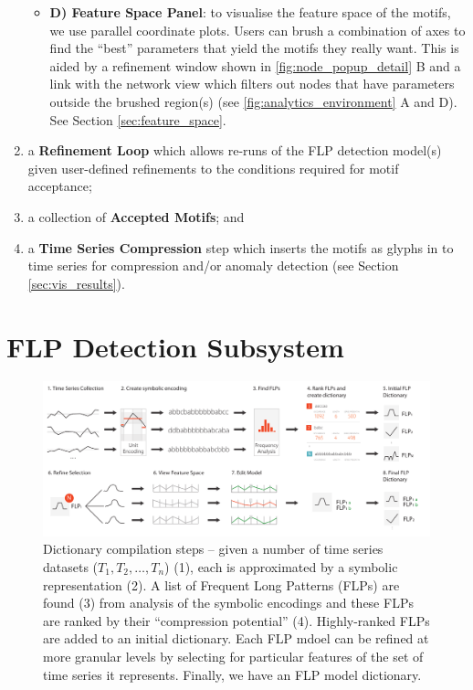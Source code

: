 \begin{enumerate}
\begin{itemize}
\item\textbf{D) Feature Space Panel}: to visualise the feature space of the motifs, we use parallel coordinate plots. 
Users can brush a combination of axes to find the ``best'' parameters that yield the motifs they really want. 
This is aided by a refinement window shown in \ref{fig:node_popup_detail} B and a link with the network view which filters out nodes that have parameters outside the brushed region(s) (see \ref{fig:analytics_environment} A and D).
See Section \ref{sec:feature_space}.

\end{itemize}

\item a \textbf{Refinement Loop} which allows re-runs of the FLP detection model(s) given user-defined refinements to the conditions required for motif acceptance;
\item a collection of \textbf{Accepted Motifs}; and 
\item a \textbf{Time Series Compression} step which inserts the motifs as glyphs in to time series for compression and/or anomaly detection (see Section \ref{sec:vis_results}).

\end{enumerate}

\section{FLP Detection Subsystem}
\label{sec:flp_detection_model}

\begin{figure}[ht!]
\centering
\includegraphics[width=\textwidth]{images/timeseries/overview.pdf}
\caption{Dictionary compilation steps -- given a number of time series datasets ($T_1, T_2, \ldots, T_n$) (1), each is approximated by a symbolic representation (2). A list of Frequent Long Patterns (FLPs) are found (3) from analysis of the symbolic encodings and these FLPs are ranked by their ``compression potential'' (4). Highly-ranked FLPs are added to an initial dictionary. Each FLP mdoel can be refined at more granular levels by selecting for particular features of the set of time series it represents.
Finally, we have an FLP model dictionary.}
\label{fig:overview}
\vspace{-10pt}
\end{figure}

